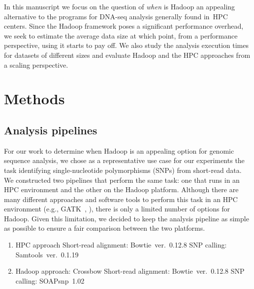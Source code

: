 \documentclass[10pt]{article}
\newcommand{\Fixme}[1]{{\color{FixmeColor}{#1}}}
\begin{document}
In this manuscript we focus on the question of {\it when} is Hadoop an appealing alternative to the programs for DNA-seq analysis generally found in~HPC centers.
Since the Hadoop framework poses a significant performance overhead, we seek to estimate the average data size at which point, from a performance perspective, using it starts to pay off. We also study the analysis execution times for datasets of different sizes and evaluate Hadoop and the HPC approaches from a scaling perspective.


\section*{Methods}

\Fixme{move this section back to the its original position if you don't like it
here (it was just before Acknowledgements)}

\subsection*{Analysis pipelines}

For our work to determine when Hadoop is an appealing option for genomic
sequence analysis, we chose as a representative 
use case for our experiments the task identifying
single-nucleotide polymorphisms (SNPs) from short-read data.  We constructed
two pipelines that perform the same task: one that runs in an HPC environment
and the other on the Hadoop platform.  Although there are many different
approaches and software tools to perform this task in an HPC environment (e.g.,
GATK~\cite{gatk}, \Fixme{Other example? Otherwise none}), there is only a limited
number of options for Hadoop.  Given this limitation, we decided to keep the
analysis pipeline as simple as possible to ensure a fair comparison between the
two platforms.

\begin{enumerate}
\item HPC approach
\subitem Short-read alignment: Bowtie~ver.~0.12.8
\subitem SNP calling: Samtools~ver.~0.1.19
\item Hadoop approach: Crossbow
\subitem Short-read alignment: Bowtie~ver.~0.12.8
\subitem SNP calling: SOAPsnp~1.02
\end{enumerate}
\end{document}

